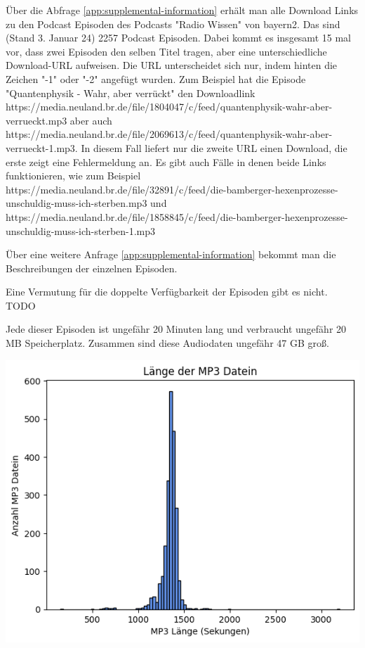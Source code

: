 Über die Abfrage \autoref{app:supplemental-information} erhält man alle Download Links zu den Podcast Episoden des Podcasts "Radio Wissen" von bayern2.
Das sind (Stand 3. Januar 24) 2257 Podcast Episoden.
Dabei kommt es insgesamt 15 mal vor, dass zwei Episoden den selben Titel tragen, aber eine unterschiedliche Download-URL aufweisen.
Die URL unterscheidet sich nur, indem hinten die Zeichen "-1" oder "-2" angefügt wurden.
Zum Beispiel hat die Episode "Quantenphysik - Wahr, aber verrückt" den Downloadlink https://media.neuland.br.de/file/1804047/c/feed/quantenphysik-wahr-aber-verrueckt.mp3 aber auch https://media.neuland.br.de/file/2069613/c/feed/quantenphysik-wahr-aber-verrueckt-1.mp3.
In diesem Fall liefert nur die zweite URL einen Download, die erste zeigt eine Fehlermeldung an.
Es gibt auch Fälle in denen beide Links funktionieren, wie zum Beispiel 
https://media.neuland.br.de/file/32891/c/feed/die-bamberger-hexenprozesse-unschuldig-muss-ich-sterben.mp3 und
https://media.neuland.br.de/file/1858845/c/feed/die-bamberger-hexenprozesse-unschuldig-muss-ich-sterben-1.mp3   

Über eine weitere Anfrage \autoref{app:supplemental-information} bekommt man die Beschreibungen der einzelnen Episoden. 

Eine Vermutung für die doppelte Verfügbarkeit der Episoden gibt es nicht. TODO

Jede dieser Episoden ist ungefähr 20 Minuten lang und verbraucht ungefähr 20 MB Speicherplatz.
Zusammen sind diese Audiodaten ungefähr 47 GB groß.

\includegraphics[width=\linewidth]{figures/mp3_length.png}

